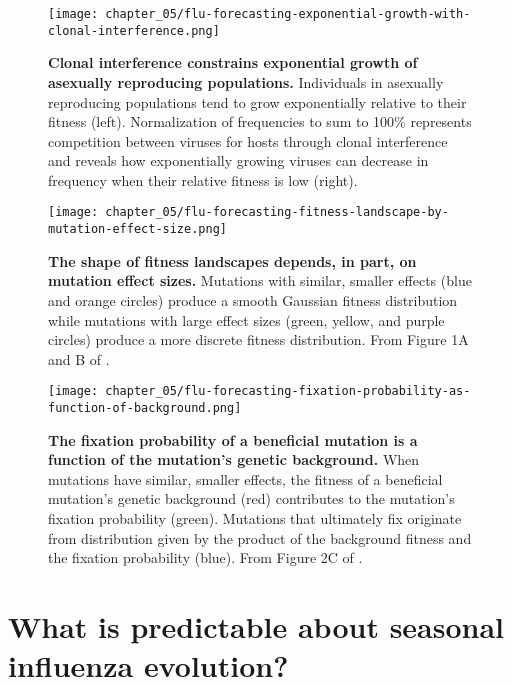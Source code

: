 \begin{figure}
  \centering
  \texttt{[image: chapter\_05/flu-forecasting-exponential-growth-with-clonal-interference.png]}
  \caption[{Clonal interference constrains exponential growth of asexually reproducing populations.}]{{\bf Clonal interference constrains exponential growth of asexually reproducing populations.}
    Individuals in asexually reproducing populations tend to grow exponentially relative to their fitness (left).
    Normalization of frequencies to sum to 100\% represents competition between viruses for hosts through clonal interference and reveals how exponentially growing viruses can decrease in frequency when their relative fitness is low (right).\label{fig:exponential-growth-with-clonal-interference} }
\end{figure}

\begin{figure}
  \centering
  \texttt{[image: chapter\_05/flu-forecasting-fitness-landscape-by-mutation-effect-size.png]}
  \caption[{The shape of fitness landscapes depends, in part, on mutation effect sizes.}]{{\bf The shape of fitness landscapes depends, in part, on mutation effect sizes.}
    Mutations with similar, smaller effects (blue and orange circles) produce a smooth Gaussian fitness distribution while mutations with large effect sizes (green, yellow, and purple circles) produce a more discrete fitness distribution.
    From Figure 1A and B of \citet{Neher2013}.\label{fig:fitness-landscape-by-mutation-effect-size} }
\end{figure}

\begin{figure}
  \centering
  \texttt{[image: chapter\_05/flu-forecasting-fixation-probability-as-function-of-background.png]}
  \caption[{The fixation probability of a beneficial mutation is a function of the mutation's genetic background.}]{{\bf The fixation probability of a beneficial mutation is a function of the mutation's genetic background.}
    When mutations have similar, smaller effects, the fitness of a beneficial mutation's genetic background (red) contributes to the mutation's fixation probability (green).
    Mutations that ultimately fix originate from distribution given by the product of the background fitness and the fixation probability (blue).
    From Figure 2C of \citet{Neher2013}.\label{fig:fixation-probability-as-function-of-background} }
\end{figure}

\section{What is predictable about seasonal influenza evolution?}

